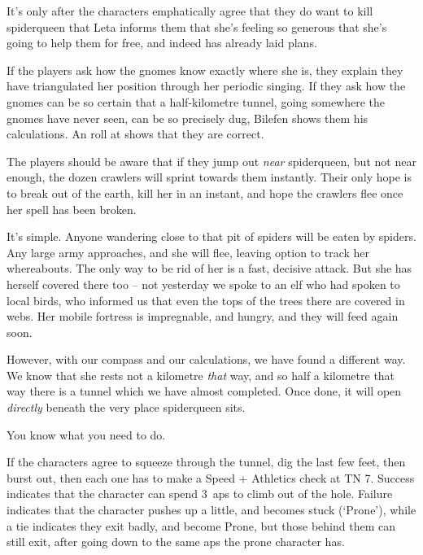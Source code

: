 It's only after the characters emphatically agree that they do want to kill \gls{spiderqueen} that Leta informs them that she's feeling so generous that she's going to help them for free, and indeed has already laid plans.

If the players ask how the gnomes know exactly where she is, they explain they have triangulated her position through her periodic singing.
If they ask how the gnomes can be so certain that a half-kilometre tunnel, going somewhere the gnomes have never seen, can be so precisely dug, Bilefen shows them his calculations.
An  roll at \tn[11] shows that they are correct.

The players should be aware that if they jump out \emph{near} \gls{spiderqueen}, but not near enough, the dozen \glspl{crawler} will sprint towards them instantly.
Their only hope is to break out of the earth, kill her in an instant, and hope the \glspl{crawler} flee once her spell has been broken.

\begin{speechtext}
  It's simple.
  Anyone wandering close to that pit of spiders will be eaten by spiders.
  Any large army approaches, and she will flee, leaving option to track her whereabouts.
  The only way to be rid of her is a fast, decisive attack.
  But she has herself covered there too -- not yesterday we spoke to an elf who had spoken to local birds, who informed us that even the tops of the trees there are covered in webs.
  Her mobile fortress is impregnable, and hungry, and they will feed again soon.

  However, with our compass and our calculations, we have found a different way.
  We know that she rests not a kilometre \emph{that} way, and so half a kilometre that way there is a tunnel which we have almost completed.
  Once done, it will open \emph{directly} beneath the very place \gls{spiderqueen} sits.

  You know what you need to do.
\end{speechtext}

If the characters agree to squeeze through the tunnel, dig the last few feet, then burst out, then each one has to make a Speed + Athletics check at TN 7.
Success indicates that the character can spend 3~\glspl{ap} to climb out of the hole.
Failure indicates that the character pushes up a little, and becomes stuck (`Prone'),%
while a tie indicates they exit badly, and become Prone, but those behind them can still exit, after going down to the same \glspl{ap} the prone character has.

